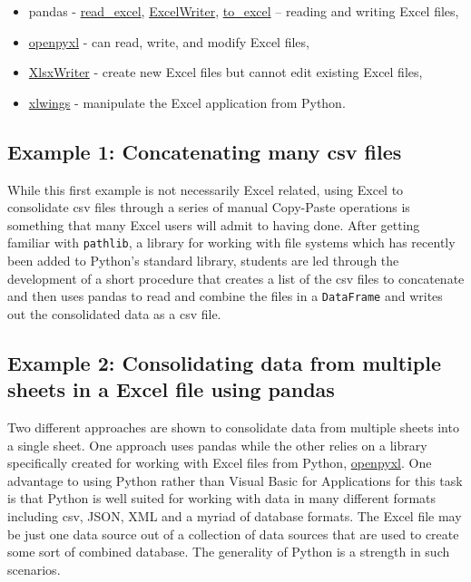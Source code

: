 \documentclass[ited]{informs3}                      %
\newcommand{\code}[1]{\texttt{#1}}
\begin{document}
\begin{itemize}
	\item
	pandas -
	\href{https://pandas.pydata.org/docs/reference/api/pandas.read_excel.html}{read\_excel},
	\href{https://pandas.pydata.org/docs/reference/api/pandas.ExcelWriter.html}{ExcelWriter},
	\href{https://pandas.pydata.org/docs/reference/api/pandas.DataFrame.to_excel.html}{to\_excel} -- reading and writing Excel files,
	\item
	\href{https://openpyxl.readthedocs.io/en/stable/}{openpyxl} - can
	read, write, and modify Excel files,
	\item
	\href{https://xlsxwriter.readthedocs.io/}{XlsxWriter} - create new Excel files but
	cannot edit existing Excel files,
	\item
	\href{https://www.xlwings.org/}{xlwings} - manipulate the Excel application from Python.
\end{itemize}


\subsection{Example 1: Concatenating many csv files}

While this first example is not necessarily Excel related, using Excel to consolidate csv files through a series of manual Copy-Paste operations is something that many Excel users will admit to having done. After getting familiar with \code{pathlib}, a library for working with file systems which has recently been added to Python's standard library, students are led through the development of a short procedure that creates a list of the csv files to concatenate and then uses pandas to read and combine the files in a \code{DataFrame} and writes out the consolidated data as a csv file.

\subsection{Example 2: Consolidating data from multiple sheets in a Excel file using pandas}

Two different approaches are shown to consolidate data from multiple sheets into a single sheet. One approach uses pandas while the other relies on a library specifically created for working with Excel files from Python, \href{https://openpyxl.readthedocs.io/en/stable/}{openpyxl}. One advantage to using Python rather than Visual Basic for Applications for this task is that Python is well suited for working with data in many different formats including csv, JSON, XML and a myriad of database formats. The Excel file may be just one data source out of a collection of data sources that are used to create some sort of combined database. The generality of Python is a strength in such scenarios.
\end{document}
